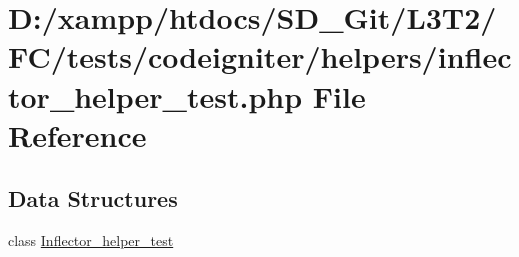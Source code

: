 \hypertarget{inflector__helper__test_8php}{}\section{D\+:/xampp/htdocs/\+S\+D\+\_\+\+Git/\+L3\+T2/\+F\+C/tests/codeigniter/helpers/inflector\+\_\+helper\+\_\+test.php File Reference}
\label{inflector__helper__test_8php}
\subsection*{Data Structures}
\begin{DoxyCompactItemize}
\item 
class \hyperlink{class_inflector__helper__test}{Inflector\+\_\+helper\+\_\+test}
\end{DoxyCompactItemize}
